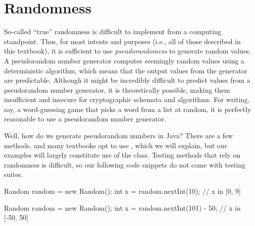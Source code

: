 \section{Randomness}
So-called ``true'' randomness is difficult to implement from a computing standpoint. Thus, for most intents and purposes (i.e., all of those described in this textbook), it is sufficient to use \textit{pseudorandomess} to generate random values. A pseudorandom number generator computes seemingly random values using a deterministic algorithm, which means that the output values from the generator are predictable. Although it might be incredibly difficult to predict values from a pseudorandom number generator, it is theoretically possible, making them insufficient and insecure for cryptographic schemata and algorithms. For writing, say, a word-guessing game that picks a word from a list at random, it is perfectly reasonable to use a pseudorandom number generator.

Well, how do we generate pseudorandom numbers in Java? There are a few methods, and many textbooks opt to use , which we will explain, but our examples will largely constitute use of the  class. Testing methods that rely on randomness is difficult, so our following code snippets do not come with testing suites. 


\begin{verbnobox}[\footnotesize]
Random random = new Random();
int x = random.nextInt(10); // x in [0, 9]
\end{verbnobox}

\begin{verbnobox}[\footnotesize]
Random random = new Random();
int x = random.nextInt(101) - 50; // x in [-50, 50]
\end{verbnobox}

